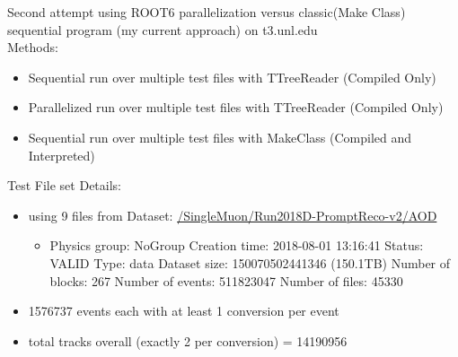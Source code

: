 \documentclass[10pt]{beamer}
\begin{document}
\begin{frame}
Second attempt using ROOT6 parallelization versus classic(Make Class) sequential program (my current approach) on  t3.unl.edu\\
Methods:\\
\begin{itemize}
\item Sequential run over multiple test files with TTreeReader (Compiled Only)
\item Parallelized run over multiple test files with TTreeReader (Compiled Only)
\item Sequential run over multiple test files with MakeClass (Compiled and Interpreted)
\end{itemize} 

Test File set Details:\\
\begin{itemize}
\item using 9 files from Dataset: \url{/SingleMuon/Run2018D-PromptReco-v2/AOD }
\begin{itemize}
\tiny
	\item Physics group: NoGroup Creation time: 2018-08-01 13:16:41 Status: VALID Type: data Dataset size: 150070502441346 (150.1TB) Number of blocks: 267 Number of events: 511823047 Number of files: 45330 
	\end{itemize}
\normalsize
\item 1576737 events each with at least 1 conversion per event
\item total tracks overall (exactly 2 per conversion) = 14190956   
\end{itemize}

\end{frame}
\end{document}

